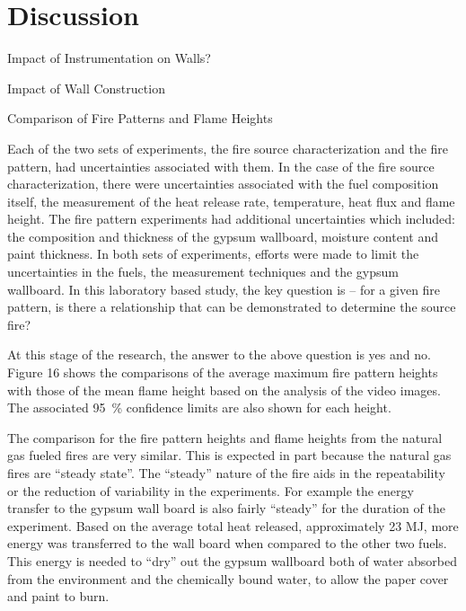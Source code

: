 \documentclass[twoside]{uocthesis}
\begin{document}
\begin{figure}[h]
  \label{FDS_FirePattern_comp}
\end{figure}



\chapter{Discussion}


Impact of Instrumentation on Walls?

Impact of Wall Construction

Comparison of Fire Patterns and Flame Heights

Each of the two sets of experiments, the fire source characterization and the fire pattern, had uncertainties associated with them.  In the case of the fire source characterization, there were uncertainties associated with the fuel composition itself, the measurement of the heat release rate, temperature, heat flux and flame height.  The fire pattern experiments had additional uncertainties which included: the composition and thickness of the gypsum wallboard, moisture content and paint thickness.  In both sets of experiments, efforts were made to limit the uncertainties in the fuels, the measurement techniques and the gypsum wallboard. In this laboratory based study, the key question is – for a given fire pattern, is there a relationship that can be demonstrated to determine the source fire?

At this stage of the research, the answer to the above question is yes and no.  Figure 16 shows the comparisons of the average maximum fire pattern heights with those of the mean flame height based on the analysis of the video images.  The associated 95~\% confidence limits are also shown for each height.  

The comparison for the fire pattern heights and flame heights from the natural gas fueled fires are very similar.  This is expected in part because the natural gas fires are “steady state”.  The “steady” nature of the fire aids in the repeatability or the reduction of variability in the experiments.  For example the energy transfer to the gypsum wall board is also fairly “steady” for the duration of the experiment.  Based on the average total heat released, approximately 23 MJ, more energy was transferred to the wall board when compared to the other two fuels.  This energy is needed to “dry” out the gypsum wallboard both of water absorbed from the environment and the chemically bound water, to allow the paper cover and paint to burn.  
\end{document}

